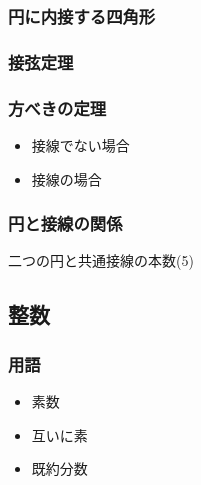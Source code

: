 \documentclass[10pt,dvipdfmx]{jsarticle}
\begin{document}
\begin{multicols}{2}
  \begin{minipage}{0.5\textwidth}
    \subsubsection*{円に内接する四角形}
  \end{minipage}
  \begin{minipage}{0.5\textwidth}
    \subsubsection*{接弦定理}
  \end{minipage}
\end{multicols}

\subsubsection*{方べきの定理}
\begin{multicols}{2}
  \begin{itemize}
    \item 接線でない場合\vspace{60mm}
    \item 接線の場合\vspace{60mm}
  \end{itemize}
\end{multicols}

\subsubsection*{円と接線の関係}
二つの円と共通接線の本数(5)
\vspace{10cm}


\newpage
\subsection*{整数}
\subsubsection*{用語}
\begin{itemize}
  \item 素数
  \item 互いに素
  \item 既約分数
\end{itemize}
\end{document}
